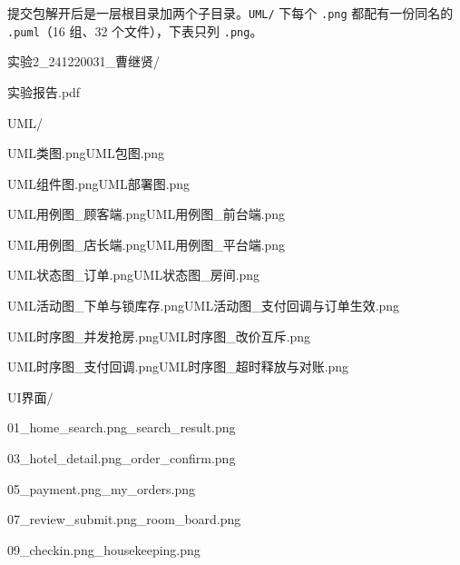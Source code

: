 提交包解开后是一层根目录加两个子目录。\texttt{UML/} 下每个 \texttt{.png} 都配有一份同名的 \texttt{.puml}（16 组、32 个文件），下表只列 \texttt{.png}。

{\ttfamily\raggedright
\noindent 实验2\_241220031\_曹继贤/\par
\noindent\hspace*{2em}实验报告.pdf\par
\noindent\hspace*{2em}UML/\par
\noindent\hspace*{4em}UML类图.png\qquad UML包图.png\par
\noindent\hspace*{4em}UML组件图.png\qquad UML部署图.png\par
\noindent\hspace*{4em}UML用例图\_顾客端.png\qquad UML用例图\_前台端.png\par
\noindent\hspace*{4em}UML用例图\_店长端.png\qquad UML用例图\_平台端.png\par
\noindent\hspace*{4em}UML状态图\_订单.png\qquad UML状态图\_房间.png\par
\noindent\hspace*{4em}UML活动图\_下单与锁库存.png\qquad UML活动图\_支付回调与订单生效.png\par
\noindent\hspace*{4em}UML时序图\_并发抢房.png\qquad UML时序图\_改价互斥.png\par
\noindent\hspace*{4em}UML时序图\_支付回调.png\qquad UML时序图\_超时释放与对账.png\par
\noindent\hspace*{2em}UI界面/\par
\noindent\hspace*{4em}01\_home\_search.png\_search\_result.png\par
\noindent\hspace*{4em}03\_hotel\_detail.png\_order\_confirm.png\par
\noindent\hspace*{4em}05\_payment.png\_my\_orders.png\par
\noindent\hspace*{4em}07\_review\_submit.png\_room\_board.png\par
\noindent\hspace*{4em}09\_checkin.png\_housekeeping.png\par
}
